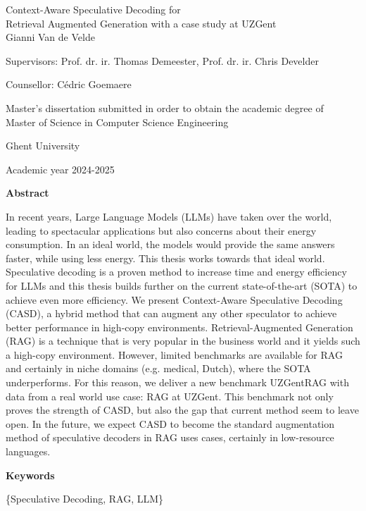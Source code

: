 \newpage
\begin{center}
    \LARGE
    Context-Aware Speculative Decoding for \\Retrieval Augmented
Generation with a case study at UZGent \\
    
    \vspace{1cm}
    \large
    Gianni Van de Velde
    
    Supervisors: Prof. dr. ir. Thomas Demeester, Prof. dr. ir. Chris Develder
    
    Counsellor: Cédric Goemaere
    
    Master's dissertation submitted in order to obtain the academic degree of\\
    Master of Science in Computer Science Engineering
    
    Ghent University
    
    Academic year 2024-2025
\end{center}

\vspace{0.5cm}
\begin{center}
    \textbf{\Large Abstract}
\end{center}

In recent years, Large Language Models (LLMs) have taken over the world, leading to spectacular applications but also concerns about their energy consumption. In an ideal world, the models would provide the same answers faster, while using less energy. This thesis works towards that ideal world. Speculative decoding is a proven method to increase time and energy efficiency for LLMs and this thesis builds further on the current state-of-the-art (SOTA) to achieve even more efficiency. We present Context-Aware Speculative Decoding (CASD), a hybrid method that can augment any other speculator to achieve better performance in high-copy environments. Retrieval-Augmented Generation (RAG) is a technique that is very popular in the business world and it yields such a high-copy environment. However, limited benchmarks are available for RAG and certainly in niche domains (e.g. medical, Dutch), where the SOTA underperforms. For this reason, we deliver a new benchmark UZGentRAG with data from a real world use case: RAG at UZGent. This benchmark not only proves the strength of CASD, but also the gap that current method seem to leave open. In the future, we expect CASD to become the standard augmentation method of speculative decoders in RAG uses cases, certainly in low-resource languages.

\begin{center}
    \textbf{\Large Keywords}
\end{center}
\begin{center}
    \{Speculative Decoding, RAG, LLM\}
\end{center}
